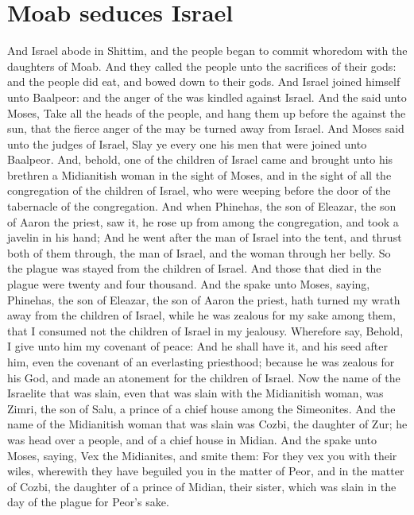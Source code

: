 \section*{Moab seduces Israel}
\begin{biblechapter} %
\verse And Israel abode in Shittim, and the people began to commit whoredom with the daughters of Moab.
\verse And they called the people unto the sacrifices of their gods: and the people did eat, and bowed down to their gods.
\verse And Israel joined himself unto Baalpeor: and the anger of the \LORD was kindled against Israel.
\verse And the \LORD said unto Moses, Take all the heads of the people, and hang them up before the \LORD against the sun, that the fierce anger of the \LORD may be turned away from Israel.
\verse And Moses said unto the judges of Israel, Slay ye every one his men that were joined unto Baalpeor.
\verse And, behold, one of the children of Israel came and brought unto his brethren a Midianitish woman in the sight of Moses, and in the sight of all the congregation of the children of Israel, who were weeping before the door of the tabernacle of the congregation.
\verse And when Phinehas, the son of Eleazar, the son of Aaron the priest, saw it, he rose up from among the congregation, and took a javelin in his hand;
\verse And he went after the man of Israel into the tent, and thrust both of them through, the man of Israel, and the woman through her belly. So the plague was stayed from the children of Israel.
\verse And those that died in the plague were twenty and four thousand.
\verse And the \LORD spake unto Moses, saying,
\verse Phinehas, the son of Eleazar, the son of Aaron the priest, hath turned my wrath away from the children of Israel, while he was zealous for my sake among them, that I consumed not the children of Israel in my jealousy.
\verse Wherefore say, Behold, I give unto him my covenant of peace:
\verse And he shall have it, and his seed after him, even the covenant of an everlasting priesthood; because he was zealous for his God, and made an atonement for the children of Israel.
\verse Now the name of the Israelite that was slain, even that was slain with the Midianitish woman, was Zimri, the son of Salu, a prince of a chief house among the Simeonites.
\verse And the name of the Midianitish woman that was slain was Cozbi, the daughter of Zur; he was head over a people, and of a chief house in Midian.
\verse And the \LORD spake unto Moses, saying,
\verse Vex the Midianites, and smite them:
\verse For they vex you with their wiles, wherewith they have beguiled you in the matter of Peor, and in the matter of Cozbi, the daughter of a prince of Midian, their sister, which was slain in the day of the plague for Peor's sake.
\end{biblechapter}

